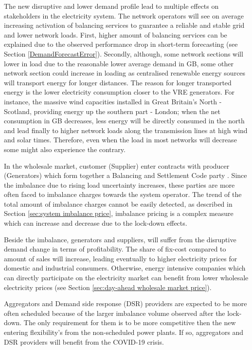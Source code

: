 \documentclass[energies,article,submit,moreauthors,pdftex]{Definitions/mdpi}
\begin{document}
The new disruptive and lower demand profile lead to multiple effects on stakeholders in the electricity system. The network operators will see on average increasing activation of balancing services to guarantee a reliable and stable grid and lower network loads. First, higher amount of balancing services can be explained due to the observed performance drop in short-term forecasting (see Section \ref{DemandForecastError}). Secondly, although, some network sections will lower in load due to the reasonable lower average demand in GB, some other network section could increase in loading as centralised renewable energy sources will transport energy for longer distances. The reason for longer transported energy is the lower electricity consumption closer to the VRE generators. For instance, the massive wind capacities installed in Great Britain's North - Scotland, providing energy up the southern part - London; when the net consumption in GB decreases, less energy will be directly consumed in the north and lead finally to higher network loads along the transmission lines at high wind and solar times. Therefore, even when the load in most networks will decrease some might also experience the contrary.

In the wholesale market, customer (Supplier) enter contracts with producer (Generators) which form together a Balancing and Settlement Code party \cite{ELEXON2019GuidanceBritain}. Since the imbalance due to rising load uncertainty increases, these parties are more often faced to imbalance charges towards the system operator. The trend of the total amount of imbalance charges cannot be easily detected, as described in Section \ref{sec:system imbalance price}, imbalance pricing is a complex measure which can increase and decrease due to the lock-down effects. 

Beside the imbalance, generators and suppliers, will suffer from the disruptive demand change in terms of profitability. The share of fix-cost compared to amount of sales will increase, leading eventually to higher electricity prices for domestic and industrial consumers. Otherwise, energy intensive companies which can directly participate on the electricity market can benefit from lower wholesale electricity prices (see Section \ref{sec:day-ahead wholesale market price}).

Aggregators and Demand side response (DSR) providers are expected to be more often scheduled because of the larger imbalance volume observed after the lock-down. The only requirement for them is to be more competitive then the new entering flexibility's from the non-scheduled power plants. If so, aggregators and DSR providers will benefit from the COVID-19 crisis.
\end{document}

